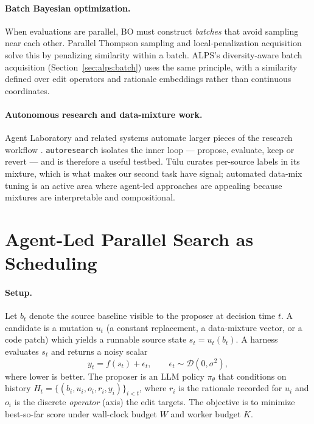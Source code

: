 \documentclass{article}
\newcommand{\alps}{ALPS\xspace}
\begin{document}
\paragraph{Batch Bayesian optimization.}
When evaluations are parallel, BO must construct \emph{batches} that avoid sampling near each other. Parallel Thompson sampling and local-penalization acquisition \citep{thompson_batch_bo} solve this by penalizing similarity within a batch. \alps's diversity-aware batch acquisition (Section~\ref{sec:alps:batch}) uses the same principle, with a similarity defined over edit operators and rationale embeddings rather than continuous coordinates.

\paragraph{Autonomous research and data-mixture work.}
Agent Laboratory and related systems automate larger pieces of the research workflow \citep{agentlab}. \texttt{autoresearch} \citep{karpathy_autoresearch} isolates the inner loop --- propose, evaluate, keep or revert --- and is therefore a useful testbed. T\"ulu \citep{tulu3} curates per-source labels in its mixture, which is what makes our second task have signal; automated data-mix tuning is an active area where agent-led approaches are appealing because mixtures are interpretable and compositional.

\section{Agent-Led Parallel Search as Scheduling}
\label{sec:problem}

\paragraph{Setup.}
Let $b_t$ denote the source baseline visible to the proposer at decision time $t$. A candidate is a mutation $u_t$ (a constant replacement, a data-mixture vector, or a code patch) which yields a runnable source state $s_t = u_t(b_t)$. A harness evaluates $s_t$ and returns a noisy scalar
\begin{equation}
  y_t = f(s_t) + \epsilon_t, \qquad \epsilon_t \sim \mathcal{D}(0, \sigma^2),
\end{equation}
where lower is better. The proposer is an LLM policy $\pi_\theta$ that conditions on history $H_t = \{(b_i,u_i,o_i,r_i,y_i)\}_{i<t}$, where $r_i$ is the rationale recorded for $u_i$ and $o_i$ is the discrete \emph{operator} (axis) the edit targets. The objective is to minimize best-so-far score under wall-clock budget $W$ and worker budget $K$.
\end{document}
